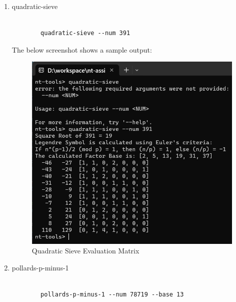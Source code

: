 \documentclass{article}
\begin{document}
\begin{enumerate}
        \item quadratic-sieve
        \begin{lstlisting}[style=DOS]

        quadratic-sieve --num 391
        \end{lstlisting}

        The below screenshot shows a sample output:
        \begin{figure}[H]
            \centering
            \includegraphics[scale=0.4]{quadratic-sieve.png}
            \caption{Quadratic Sieve Evaluation Matrix}
        \end{figure}

        \item pollards-p-minus-1
        \begin{lstlisting}[style=DOS]

        pollards-p-minus-1 --num 78719 --base 13
        \end{lstlisting}


\end{enumerate}
\end{document}
